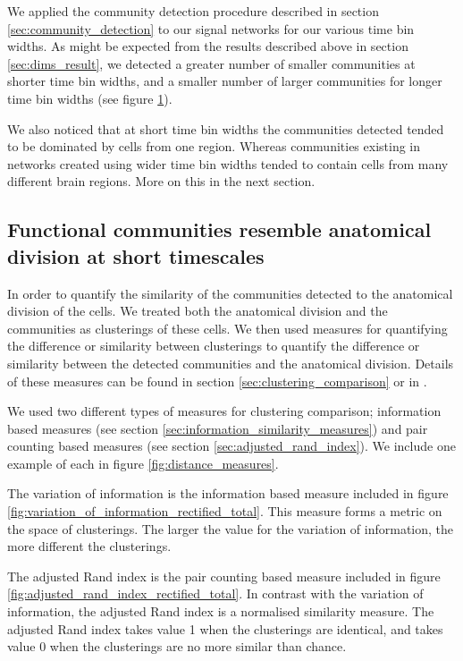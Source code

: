\begin{figure}
    \label{fig:consensus_clusterings_with_regions}
  \end{figure}

  We applied the community detection procedure described in section \ref{sec:community_detection} to our signal networks for our various time bin widths. As might be expected from the results described above in section \ref{sec:dims_result}, we detected a greater number of smaller communities at shorter time bin widths, and a smaller number of larger communities for longer time bin widths (see figure \ref{fig:consensus_clusterings_with_regions}).

  We also noticed that at short time bin widths the communities detected tended to be dominated by cells from one region. Whereas communities existing in networks created using wider time bin widths tended to contain cells from many different brain regions. More on this in the next section.


  \subsection{Functional communities resemble anatomical division at short timescales}
  In order to quantify the similarity of the communities detected to the anatomical division of the cells. We treated both the anatomical division and the communities as clusterings of these cells. We then used measures for quantifying the difference or similarity between clusterings to quantify the difference or similarity between the detected communities and the anatomical division. Details of these measures can be found in section \ref{sec:clustering_comparison} or in  \parencite{vinh}.

  We used two different types of measures for clustering comparison; information based measures (see section \ref{sec:information_similarity_measures}) and pair counting based measures (see section \ref{sec:adjusted_rand_index}). We include one example of each in figure \ref{fig:distance_measures}.

  The variation of information is the information based measure included in figure \ref{fig:variation_of_information_rectified_total}. This measure forms a metric on the space of clusterings. The larger the value for the variation of information, the more different the clusterings.

  The adjusted Rand index is the pair counting based measure included in figure \ref{fig:adjusted_rand_index_rectified_total}. In contrast with the variation of information, the adjusted Rand index is a normalised similarity measure. The adjusted Rand index takes value 1 when the clusterings are identical, and takes value 0 when the clusterings are no more similar than chance.

